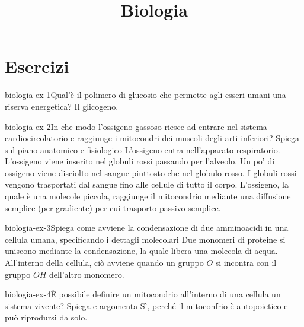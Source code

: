 \documentclass[preview]{standalone}
\begin{document}
\title{Biologia}
\genpage

\section{Esercizi}

\begin{snippetexercise}{biologia-ex-1}{Qual'è il polimero di glucosio che permette agli esseri umani una riserva energetica?}
    Il glicogeno.
\end{snippetexercise}

\begin{snippetexercise}{biologia-ex-2}{In che modo l'ossigeno gassoso riesce ad entrare nel sistema cardiocircolatorio e raggiunge i mitocondri dei muscoli degli arti inferiori? Spiega sul piano anatomico e fisiologico}
    L'ossigeno entra nell'apparato respiratorio.
    L'ossigeno viene inserito nel globuli rossi passando per l'alveolo.
    Un po' di ossigeno viene disciolto nel sangue piuttosto che nel globulo rosso.
    I globuli rossi vengono trasportati dal sangue fino alle cellule di tutto il corpo.
    L'ossigeno, la quale è una molecole piccola, raggiunge il mitocondrio mediante una diffusione semplice (per gradiente) per cui trasporto passivo semplice.
\end{snippetexercise}

\begin{snippetexercise}{biologia-ex-3}{Spiega come avviene la condensazione di due amminoacidi in una cellula umana, specificando i dettagli molecolari}
    Due monomeri di proteine si uniscono mediante la condensazione, la quale libera una molecola di acqua.
    All'interno della cellula, ciò avviene quando un gruppo \(O\) si incontra con il gruppo \(OH\) dell'altro monomero.
\end{snippetexercise}

\begin{snippetexercise}{biologia-ex-4}{È possibile definire un mitocondrio all'interno di una cellula un sistema vivente? Spiega e argomenta}
    Sì, perché il mitoconfrio è autopoietico e può riprodursi da solo.
\end{snippetexercise}
\end{document}
